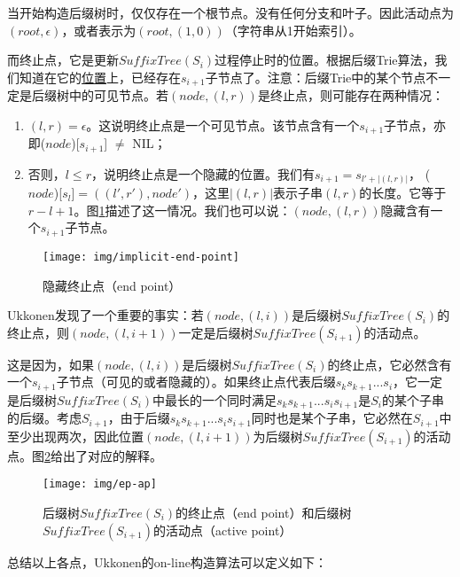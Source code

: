 \documentclass{ctexart}
\begin{document}
当开始构造后缀树时，仅仅存在一个根节点。没有任何分支和叶子。因此活动点为$(root, \epsilon)$，或者表示为$(root, (1, 0))$（字符串从1开始索引）。

而终止点，它是更新$SuffixTree(S_i)$过程停止时的位置。根据后缀Trie算法，我们知道在它的\underline{位置}上，已经存在$s_{i+1}$子节点了。注意：后缀Trie中的某个节点不一定是后缀树中的可见节点。若$(node, (l, r))$是终止点，则可能存在两种情况：

\begin{enumerate}
\item $(l, r)=\epsilon$。这说明终止点是一个可见节点。该节点含有一个$s_{i+1}$子节点，亦即($node$)[$s_{i+1}$] $\neq$ NIL；
\item 否则，$l \leq r$，说明终止点是一个隐藏的位置。我们有$s_{i+1}=s_{l'+|(l, r)|}$，
($node$)[$s_l$]$=((l', r'), node')$，这里$|(l, r)|$表示子串$(l, r)$的长度。它等于$r-l+1$。图\ref{fig:implicit-end-point}描述了这一情况。我们也可以说：$(node, (l, r))$隐藏含有一个$s_{i+1}$子节点。
\end{enumerate}

\begin{figure}[htbp]
  \centering
  \texttt{[image: img/implicit-end-point]}
  \caption{隐藏终止点（end point）}
  \label{fig:implicit-end-point}
\end{figure}

Ukkonen发现了一个重要的事实：若$(node, (l, i))$是后缀树$SuffixTree(S_i)$的终止点，则$(node, (l, i+1))$一定是后缀树$SuffixTree(S_{i+1})$的活动点。

这是因为，如果$(node, (l, i))$是后缀树$SuffixTree(S_i)$的终止点，它必然含有一个$s_{i+1}$子节点（可见的或者隐藏的）。如果终止点代表后缀$s_ks_{k+1}...s_i$，它一定是后缀树$SuffixTree(S_i)$中最长的一个同时满足$s_ks_{k+1}...s_is_{i+1}$是$S_i$的某个子串的后缀。考虑$S_{i+1}$，由于后缀$s_ks_{k+1}...s_is_{i+1}$同时也是某个子串，它必然在$S_{i+1}$中至少出现两次，因此位置$(node, (l, i+1))$为后缀树$SuffixTree(S_{i+1})$的活动点。图\ref{fig:ep-ap}给出了对应的解释。

\begin{figure}[htbp]
  \centering
  \texttt{[image: img/ep-ap]}
  \caption{后缀树$SuffixTree(S_i)$的终止点（end point）和后缀树$SuffixTree(S_{i+1})$的活动点（active point）}
  \label{fig:ep-ap}
\end{figure}

总结以上各点，Ukkonen的on-line构造算法可以定义如下：
\end{document}
